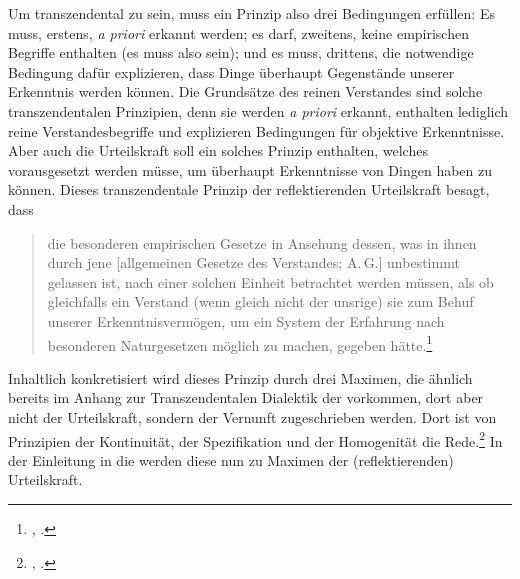 \begin{nummerierung}
Um transzendental zu sein, muss ein Prinzip also drei Bedingungen erfüllen: Es
muss, erstens, \emph{a priori} erkannt werden; es darf, zweitens, keine
empirischen Begriffe enthalten (es muss also  sein); und es
muss, drittens, die notwendige Bedingung dafür explizieren, dass Dinge
überhaupt Gegenstände unserer Erkenntnis werden können. Die Grundsätze des
reinen Verstandes sind solche transzendentalen Prinzipien, denn sie werden
\emph{a priori} erkannt, enthalten lediglich reine Verstandesbegriffe und
explizieren Bedingungen für objektive Erkenntnisse. Aber auch die Urteilskraft
soll ein solches Prinzip enthalten, welches vorausgesetzt werden müsse, um
überhaupt Erkenntnisse von Dingen haben zu können. Dieses transzendentale
Prinzip der reflektierenden Urteilskraft besagt, dass
\begin{quote}
 die besonderen empirischen Gesetze in Ansehung dessen, was in ihnen durch jene
[allgemeinen Gesetze des Verstandes; A.\,G.] unbestimmt gelassen ist, nach einer
solchen Einheit betrachtet werden müssen, als ob gleichfalls ein Verstand (wenn
gleich nicht der unsrige) sie zum Behuf unserer Erkenntnisvermögen, um ein
System der Erfahrung nach besonderen Naturgesetzen möglich zu machen, gegeben
hätte.\footnote{\cite[][B~xxvii]{Kant:KritikderUrteilskraft2009}, \cite[][V:
180.21-26]{Kant:GesammelteWerke1900ff.}.}
\end{quote}
Inhaltlich konkretisiert wird dieses Prinzip durch drei Maximen, die ähnlich
bereits im Anhang zur Transzendentalen Dialektik der  vorkommen, dort aber nicht der Urteilskraft, sondern der Vernunft zugeschrieben
werden. Dort ist von Prinzipien der Kontinuität, der Spezifikation und der
Homogenität die Rede.\footnote{\cite[Siehe][B
686]{Kant:KritikderreinenVernunft2003}, \cite[][III:
435.33--35]{Kant:GesammelteWerke1900ff.}.} In der Einleitung in die
 werden diese nun zu Maximen der
(reflektierenden) Urteilskraft.


\end{nummerierung}
